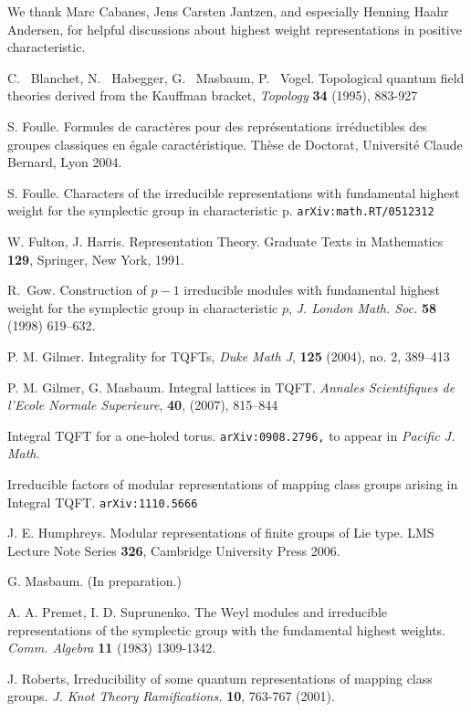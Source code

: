 \documentclass{amsart}
\begin{document}
\vskip 8pt
 We thank Marc Cabanes, Jens Carsten
Jantzen, and especially Henning Haahr Andersen, for helpful discussions about highest weight
representations in positive characteristic. 

 

\begin{thebibliography}{BHMVZ}

 {\sc  C. ~Blanchet, N. ~Habegger, G. ~Masbaum,  P. ~Vogel.}
Topological quantum field theories derived from the Kauffman bracket,
{\em Topology}   {\bf 34} (1995), 883-927

 {\sc S. Foulle.} Formules de caract{\`e}res pour des
  repr{\'e}sentations 
  irr{\'e}ductibles des groupes classiques en {\'e}gale
                 caract{\'e}ristique. Th{\`e}se de Doctorat, Universit{\'e} Claude
                 Bernard, Lyon 2004.

 {\sc S. Foulle.} Characters of the irreducible
  representations with fundamental highest weight for the symplectic
  group in characteristic p. {\tt arXiv:math.RT/0512312} 

 {\sc W. Fulton, J. Harris.} Representation
  Theory. Graduate Texts in Mathematics {\bf 129}, Springer, New York,
  1991.

 {\sc R.~Gow.}  Construction of $p-1$ irreducible modules with fundamental highest 
weight for the symplectic group in characteristic $p$, {\em J. London Math. Soc.} 
{\bf58} (1998) 619--632.
 

 {\sc P. M. Gilmer.}  {Integrality for TQFTs}, {\em Duke Math J}, {\bf 125} (2004), no. 2, 389--413  

 {\sc P. M. Gilmer, G. Masbaum.} Integral lattices in 
TQFT. { \em Annales Scientifiques de l'Ecole Normale Superieure}, {\bf
  40}, (2007), 815--844

{Integral TQFT for a one-holed torus.} 
{\tt arXiv:0908.2796,}
to appear in {\em Pacific J. Math.}

 {Irreducible factors 
of modular representations of mapping
  class groups arising in Integral
TQFT.}  
{\tt arXiv:1110.5666}

 {\sc J. E. Humphreys.} Modular representations of
  finite groups of Lie type. LMS Lecture Note Series {\bf 326},
  Cambridge University Press 2006.

  {\sc G. Masbaum.}   
(In preparation.) 

 {\sc A. A. Premet, I. D. Suprunenko.} The Weyl
  modules and irreducible representations of the symplectic group with
  the fundamental highest weights. {\em Comm. Algebra} {\bf 11} (1983)
1309-1342.

 {\sc J. Roberts,} Irreducibility of some quantum
representations of mapping class groups. 
{\em J. Knot Theory Ramifications.} {\bf 10}, 763-767 (2001). 

\end{thebibliography}
\end{document}
